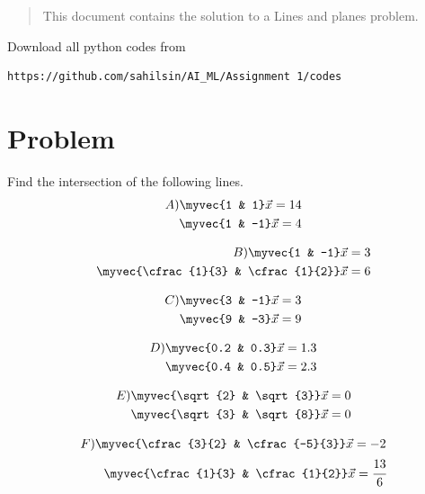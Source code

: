 \begin{enumerate}[label=\thesection.\arabic*.,ref=\thesection.\theenumi]

\begin{abstract}
This document contains the solution to a Lines and planes problem.
\end{abstract}
Download all python codes from 
%
\begin{lstlisting}
https://github.com/sahilsin/AI_ML/Assignment 1/codes
\end{lstlisting}

\section{Problem}
Find the intersection of the following lines.
\begin{align}
A)
\myvec{1  &  1}\vec{x}=14\\
\myvec{1 & -1}\vec{x}=4\\
\end{align}

\begin{align}
B)
\myvec{1  &  -1}\vec{x}=3\\
\myvec{\cfrac{1}{3} & \cfrac{1}{2}}\vec{x}=6\\
\end{align}

\begin{align}
C)
\myvec{3  &  -1}\vec{x}=3\\
\myvec{9 & -3}\vec{x}=9\\
\end{align}

\begin{align}
D)
\myvec{0.2  &  0.3}\vec{x}=1.3\\
\myvec{0.4 & 0.5}\vec{x}=2.3\\
\end{align}

\begin{align}
E)
\myvec{\sqrt{2}  &  \sqrt{3}}\vec{x}=0\\
\myvec{\sqrt{3} & \sqrt{8}}\vec{x}=0\\
\end{align}

\begin{align}
F)
\myvec{\cfrac{3}{2}  &  \cfrac{-5}{3}}\vec{x}=-2\\
\myvec{\cfrac{1}{3} & \cfrac{1}{2}}\vec{x}=\cfrac{13}{6}\\
\end{align}



\end{enumerate}
